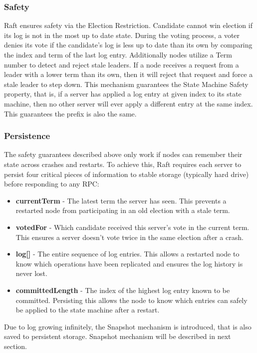 \documentclass[shortabstract]{iithesis}
\begin{document}
\subsubsection{Safety}
Raft ensures safety via the Election Restriction. Candidate cannot win election if its log is not in the most up to date state. During the voting process, a voter denies its vote if the candidate's log is less up to date than its own by comparing the index and term of the last log entry. Additionally nodes utilize a Term number to detect and reject stale leaders. If a node receives a request from a leader with a lower term than its own, then it will reject that request and force a stale leader to step down. This mechanism guarantees the State Machine Safety property, that is, if a server has applied a log entry at given index to its state machine, then no other server will ever apply a different entry at the same index. This guarantees the prefix is also the same.

\subsubsection{Persistence}
The safety guarantees described above only work if nodes can remember their state across crashes and restarts. To achieve this, Raft requires each server to persist four critical pieces of information to stable storage (typically hard drive) before responding to any RPC:
\begin{itemize}
    \item \textbf{currentTerm} - The latest term the server has seen. This prevents a restarted node from participating in an old election with a stale term.
    \item \textbf{votedFor} - Which candidate received this server's vote in the current term. This ensures a server doesn't vote twice in the same election after a crash.
    \item \textbf{log[]} - The entire sequence of log entries. This allows a restarted node to know which operations have been replicated and ensures the log history is never lost.
    \item \textbf{committedLength} - The index of the highest log entry known to be committed. Persisting this allows the node to know which entries can safely be applied to the state machine after a restart.
\end{itemize}
Due to log growing infinitely, the Snapshot mechanism is introduced, that is also saved to persistent storage. Snapshot mechanism will be described in next section. \label{subsec:persistence_desc} 
\end{document}
